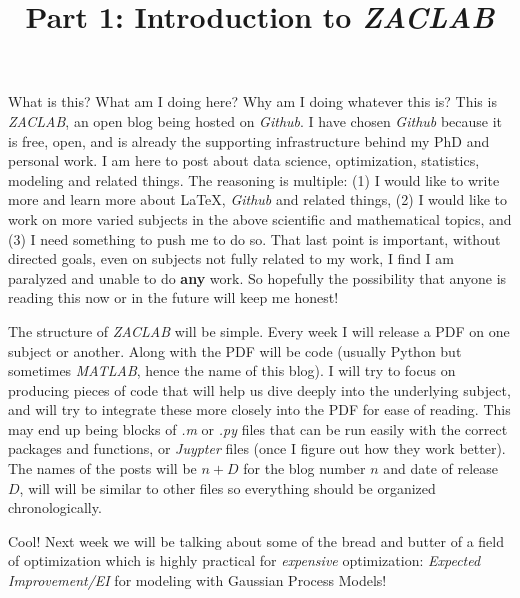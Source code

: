 \documentclass[12pt]{article}
\title{\textbf{Part 1: Introduction to \emph{ZACLAB}}}
\begin{document}
\maketitle

What is this? What am I doing here? Why am I doing whatever this is? This is \emph{ZACLAB}, an open blog being hosted on \emph{Github}. I have chosen \emph{Github} because it is free, open, and is already the supporting infrastructure behind my PhD and personal work. I am here to post about data science, optimization, statistics, modeling and related things. The reasoning is multiple: (1) I would like to write more and learn more about \LaTeX, \emph{Github} and related things, (2) I would like to work on more varied subjects in the above scientific and mathematical topics, and (3) I need something to push me to do so. That last point is important, without directed goals, even on subjects not fully related to my work, I find I am paralyzed and unable to do \textbf{any} work. So hopefully the possibility that anyone is reading this now or in the future will keep me honest!

\vspace{5mm}

The structure of \emph{ZACLAB} will be simple. Every week I will release a PDF on one subject or another. Along with the PDF will be code (usually Python but sometimes \emph{MATLAB}, hence the name of this blog). I will try to focus on producing pieces of code that will help us dive deeply into the underlying subject, and will try to integrate these more closely into the PDF for ease of reading. This may end up being blocks of \emph{.m} or \emph{.py} files that can be run easily with the correct packages and functions, or \emph{Juypter} files (once I figure out how they work better). The names of the posts will be $n + D$ for the blog number $n$ and date of release $D$, will will be similar to other files so everything should be organized chronologically.

\vspace{5mm}

Cool! Next week we will be talking about some of the bread and butter of a field of optimization which is highly practical for \emph{expensive} optimization: \emph{Expected Improvement/EI} for modeling with Gaussian Process Models!
\end{document}
